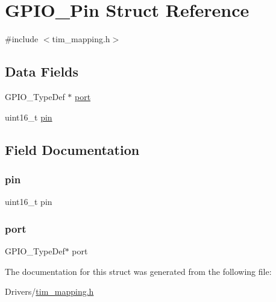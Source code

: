 \hypertarget{struct_g_p_i_o___pin}{}\section{G\+P\+I\+O\+\_\+\+Pin Struct Reference}
\label{struct_g_p_i_o___pin}


{\ttfamily \#include $<$tim\+\_\+mapping.\+h$>$}

\subsection*{Data Fields}
\begin{DoxyCompactItemize}
\item 
G\+P\+I\+O\+\_\+\+Type\+Def $\ast$ \hyperlink{struct_g_p_i_o___pin_a82241972e0292c7de95ea1e293e11be3}{port}
\item 
uint16\+\_\+t \hyperlink{struct_g_p_i_o___pin_a4144813adfa4dfe7e7cbeea17d1b06eb}{pin}
\end{DoxyCompactItemize}


\subsection{Field Documentation}
\mbox{\label{struct_g_p_i_o___pin_a4144813adfa4dfe7e7cbeea17d1b06eb}} 
\subsubsection{\texorpdfstring{pin}{pin}}
{\footnotesize\ttfamily uint16\+\_\+t pin}

\mbox{\label{struct_g_p_i_o___pin_a82241972e0292c7de95ea1e293e11be3}} 
\subsubsection{\texorpdfstring{port}{port}}
{\footnotesize\ttfamily G\+P\+I\+O\+\_\+\+Type\+Def$\ast$ port}



The documentation for this struct was generated from the following file\+:\begin{DoxyCompactItemize}
\item 
Drivers/\hyperlink{tim__mapping_8h}{tim\+\_\+mapping.\+h}\end{DoxyCompactItemize}
